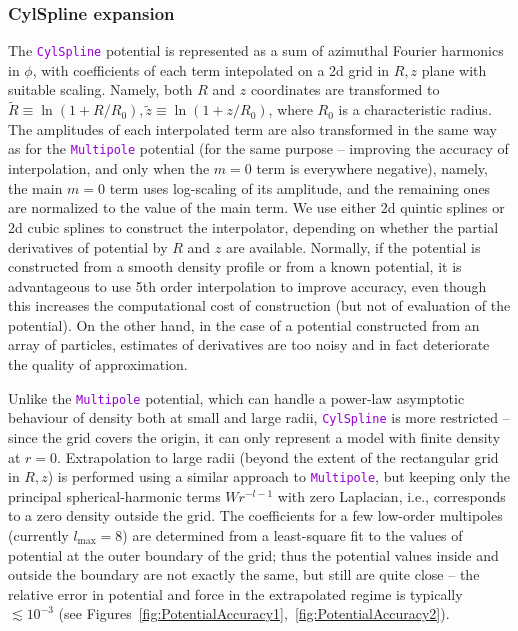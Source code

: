 \documentclass[12pt]{article}
\newcommand{\ttt}[1]{\textcolor{darkviolet}{\texttt{#1}}}
\begin{document}
\subsubsection{CylSpline expansion}  \label{sec:PotentialCylSplineDetails}

The \ttt{CylSpline} potential is represented as a sum of azimuthal Fourier harmonics in $\phi$, with coefficients of each term intepolated on a 2d grid in $R,z$ plane with suitable scaling.
Namely, both $R$ and $z$ coordinates are transformed to $\tilde R \equiv \ln(1+R/R_0), \tilde z \equiv \ln(1+z/R_0)$, where $R_0$ is a characteristic radius. The amplitudes of each interpolated term are also transformed in the same way as for the \ttt{Multipole} potential (for the same purpose -- improving the accuracy of interpolation, and only when the $m=0$ term is everywhere negative), namely, the main $m=0$ term uses log-scaling of its amplitude, and the remaining ones are normalized to the value of the main term. We use either 2d quintic splines or 2d cubic splines to construct the interpolator, depending on whether the partial derivatives of potential by $R$ and $z$ are available. Normally, if the potential is constructed from a smooth density profile or from a known potential, it is advantageous to use 5th order interpolation to improve accuracy, even though this increases the computational cost of construction (but not of evaluation of the potential). On the other hand, in the case of a potential constructed from an array of particles, estimates of derivatives are too noisy and in fact deteriorate the quality of approximation.

Unlike the \ttt{Multipole} potential, which can handle a power-law asymptotic behaviour of density both at small and large radii, \ttt{CylSpline} is more restricted -- since the grid covers the origin, it can only represent a model with finite density at $r=0$. Extrapolation to large radii (beyond the extent of the rectangular grid in $R,z$) is performed using a similar approach to \ttt{Multipole}, but keeping only the principal spherical-harmonic terms $W r^{-l-1}$ with zero Laplacian, i.e., corresponds to a zero density outside the grid. The coefficients for a few low-order multipoles (currently $l_\mathrm{max}=8$) are determined from a least-square fit to the values of potential at the outer boundary of the grid; thus the potential values inside and outside the boundary are not exactly the same, but still are quite close -- the relative error in potential and force in the extrapolated regime is typically $\lesssim 10^{-3}$ (see Figures~\ref{fig:PotentialAccuracy1},~\ref{fig:PotentialAccuracy2}).
\end{document}

